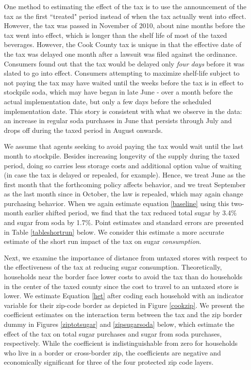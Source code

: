 \documentclass[12pt]{article}
\begin{document}
One method to estimating the effect of the tax is to use the announcement of the tax as the first ``treated" period instead of when the tax actually went into effect. However, the tax was passed in November of 2010, about nine months before the tax went into effect, which is longer than the shelf life of most of the taxed beverages. However, the Cook County tax is unique in that the effective date of the tax was delayed one month after a lawsuit was filed against the ordinance. Consumers found out that the tax would be delayed only \textit{four days} before it was slated to go into effect. Consumers attempting to maximize shelf-life subject to not paying the tax may have waited until the weeks before the tax is in effect to stockpile soda, which may have began in late June - over a month before the actual implementation date, but only a few days before the scheduled implementation date. This story is consistent with what we observe in the data: an increase in regular soda purchases in June that persists through July and drops off during the taxed period in August onwards.

We assume that agents seeking to avoid paying the tax would wait until the last month to stockpile. Besides increasing longevity of the supply during the taxed period, doing so carries less storage costs and additional option value of waiting (in case the tax is delayed or repealed, for example). Hence, we treat June as the first month that the forthcoming policy affects behavior, and we treat September as the last month since in October, the law is repealed, which may again change purchasing behavior. When we again estimate equation \ref{baseline} using this two-month earlier shifted period, we find that the tax reduced total sugar by 3.4\% and sugar from soda by 1.7\%. Point estimates and standard errors are presented in Table \ref{tableshortrun} below. We consider this estimate a more accurate estimate of the short run impact of the tax on sugar \textit{consumption}.

Next, we examine the importance of distance from untaxed stores with respect to the effectiveness of the tax at reducing sugar consumption. Theoretically, households near the border face lower costs to avoid the tax than do households in the center of the taxed county since the cost to travel to an untaxed store is lower. We estimate Equation \ref{het} after coding each household with an indicator variable for their zip-code border as depicted in Figure \ref{cookzip}. We present the coefficient estimates on the interaction term between the tax and the zip border dummy in Figures \ref{ziptotsugar} and \ref{zipsugarsoda} below, which estimate the effect of the tax on total sugar purchases and sugar from soda purchases, respectively. While the coefficient is indistinguishable from zero for households who live in a border or cross-border zip, the coefficients are negative and economically significant for three of the four protected zip code layers.
\end{document}
